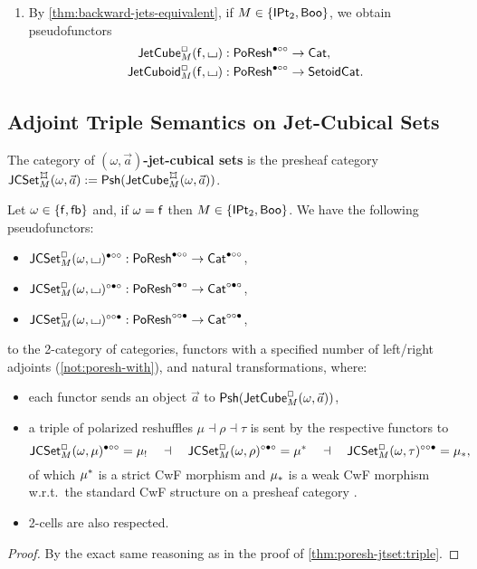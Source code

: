 \documentclass[a4paper]{memoir}
\begin{document}
\begin{definition}
\begin{enumerate}
		\item By \cref{thm:backward-jets-equivalent}, if $M \in \mathopen{}\left\{ {\mathsf{IPt}_2}, \mathsf{Boo} \right\}\mathclose{}$, we obtain pseudofunctors
		\begin{align*}
			\mathsf{JetCube}^{\Box}_{M}({\mathsf{f}},{\llcorner\hspace{-.4ex}\lrcorner}) &: \mathsf{PoResh}^{\bullet \circ \circ} \to {\mathsf{Cat}}, \\
			\mathsf{JetCuboid}^{\Box}_{M}({\mathsf{f}},{\llcorner\hspace{-.4ex}\lrcorner}) &: \mathsf{PoResh}^{\bullet \circ \circ} \to {\mathsf{Setoid}}{\mathsf{Cat}}.
		\end{align*}
	\end{enumerate}
\end{definition}

\subsection{Adjoint Triple Semantics on Jet-Cubical Sets} \label{sec:poresh-jcset:triple}
\begin{definition}
	The category of \textbf{$(\omega, \vec a)$-jet-cubical sets} is the presheaf category $\jcset{\omega}{\mycubex}{M}{\vec a} := \Psh(\jetcube{\omega}{\mycubex}{M}{\vec a})$.
\end{definition}
\begin{theorem} \label{thm:poresh-jcset:triple}
	Let $\omega \in \mathopen{}\left\{ {\mathsf{f}}, {\mathsf{fb}} \right\}\mathclose{}$ and, if $\omega = {\mathsf{f}}$ then $M \in \mathopen{}\left\{ {\mathsf{IPt}_2}, \mathsf{Boo} \right\}\mathclose{}$.
	We have the following pseudofunctors:
	\begin{itemize}
		\item $\mathsf{JCSet}^{\Box}_{M}(\omega,{\llcorner\hspace{-.4ex}\lrcorner})^{\bullet \circ \circ} : \mathsf{PoResh}^{\bullet \circ \circ} \to {\mathsf{Cat}}^{\bullet \circ \circ}$,
		\item $\mathsf{JCSet}^{\Box}_{M}(\omega,{\llcorner\hspace{-.4ex}\lrcorner})^{\circ \bullet \circ} : \mathsf{PoResh}^{\circ \bullet \circ} \to {\mathsf{Cat}}^{\circ \bullet \circ}$,
		\item $\mathsf{JCSet}^{\Box}_{M}(\omega,{\llcorner\hspace{-.4ex}\lrcorner})^{\circ \circ \bullet} : \mathsf{PoResh}^{\circ \circ \bullet} \to {\mathsf{Cat}}^{\circ \circ \bullet}$,
	\end{itemize}
	to the 2-category of categories, functors with a specified number of left/right adjoints (\cref{not:poresh-with}), and natural transformations, where:
	\begin{itemize}
		\item each functor sends an object $\vec a$ to ${\mathsf{Psh}}(\mathsf{JetCube}^{\Box}_{M}(\omega,\vec a))$,
		\item a triple of polarized reshuffles $\mu \dashv \rho \dashv \tau$ is sent by the respective functors to
		\[
			\mathsf{JCSet}^{\Box}_{M}(\omega,\mu)^{\bullet \circ \circ} = {\mu}_!
			\quad\dashv\quad
			\mathsf{JCSet}^{\Box}_{M}(\omega,\rho)^{\circ \bullet \circ} = {\mu}^*
			\quad\dashv\quad
			\mathsf{JCSet}^{\Box}_{M}(\omega,\tau)^{\circ \circ \bullet} = {\mu}_*,
		\]
		of which ${\mu}^*$ is a strict CwF morphism \cite{dybjer-cwf} and ${\mu}_*$ is a weak CwF morphism \cite[def.\ 2.1.1]{reldtt-techreport}\cite[def.\ 3.2.5]{nuyts-phd} w.r.t.\ the standard CwF structure on a presheaf category \cite[ch.\ 4]{Hofmann97}\cite[\S 4.1]{nuyts-phd}.
		\item 2-cells are also respected.
	\end{itemize}
\end{theorem}
\begin{proof}
	By the exact same reasoning as in the proof of \cref{thm:poresh-jtset:triple}.
\end{proof}
\end{document}

